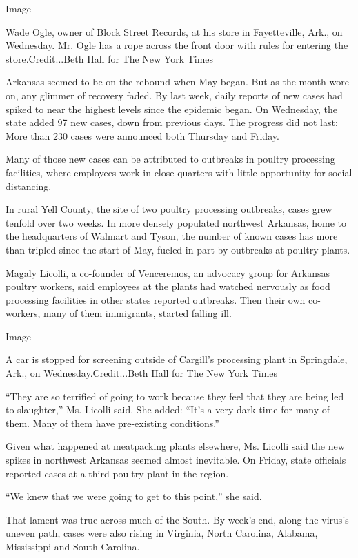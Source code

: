 Image

Wade Ogle, owner of Block Street Records, at his store in Fayetteville,
Ark., on Wednesday. Mr. Ogle has a rope across the front door with rules
for entering the store.Credit...Beth Hall for The New York Times

Arkansas seemed to be on the rebound when May began. But as the month
wore on, any glimmer of recovery faded. By last week, daily reports of
new cases had spiked to near the highest levels since the epidemic
began. On Wednesday, the state added 97 new cases, down from previous
days. The progress did not last: More than 230 cases were announced both
Thursday and Friday.

Many of those new cases can be attributed to outbreaks in poultry
processing facilities, where employees work in close quarters with
little opportunity for social distancing.

In rural Yell County, the site of two poultry processing outbreaks,
cases grew tenfold over two weeks. In more densely populated northwest
Arkansas, home to the headquarters of Walmart and Tyson, the number of
known cases has more than tripled since the start of May, fueled in part
by outbreaks at poultry plants.

Magaly Licolli, a co-founder of Venceremos, an advocacy group for
Arkansas poultry workers, said employees at the plants had watched
nervously as food processing facilities in other states reported
outbreaks. Then their own co-workers, many of them immigrants, started
falling ill.

Image

A car is stopped for screening outside of Cargill's processing plant in
Springdale, Ark., on Wednesday.Credit...Beth Hall for The New York Times

``They are so terrified of going to work because they feel that they are
being led to slaughter,'' Ms. Licolli said. She added: ``It's a very
dark time for many of them. Many of them have pre-existing conditions.''

Given what happened at meatpacking plants elsewhere, Ms. Licolli said
the new spikes in northwest Arkansas seemed almost inevitable. On
Friday, state officials reported cases at a third poultry plant in the
region.

``We knew that we were going to get to this point,'' she said.

That lament was true across much of the South. By week's end, along the
virus's uneven path, cases were also rising in Virginia, North Carolina,
Alabama, Mississippi and South Carolina.

